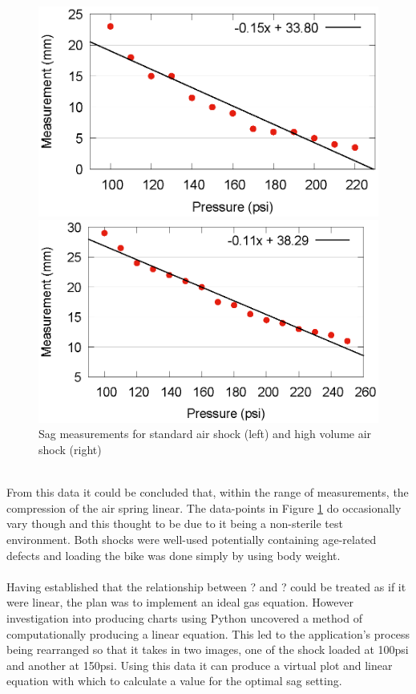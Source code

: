 			\begin{figure}[h!]
				\centering
				\begin{minipage}{0.4\textwidth}
					\centering
					\includegraphics[width=\textwidth]{../images/results/fox_scatter.eps}
				\end{minipage}
				\begin{minipage}{0.4\textwidth}
					\centering
					\includegraphics[width=\textwidth]{../images/results/rs_scatter.eps}
				\end{minipage}
				\caption{Sag measurements for standard air shock (left) and high volume air shock (right)}
				\label{fig:scatters}
			\end{figure}\\
			From this data it could be concluded that, within the range of measurements, the compression of the air spring linear. The data-points in Figure \ref{fig:scatters} do occasionally vary though and this thought to be due to it being a non-sterile test environment. Both shocks were well-used potentially containing age-related defects and loading the bike was done simply by using body weight.
			\\\\
			Having established that the relationship between ? and ? could be treated as if it were linear, the plan was to implement an ideal gas equation. However investigation into producing charts using Python uncovered a method of computationally producing a linear equation. This led to the application’s process being rearranged so that it takes in two images, one of the shock loaded at 100psi and another at 150psi. Using this data it can produce a virtual plot and linear equation with which to calculate a value for the optimal sag setting.
